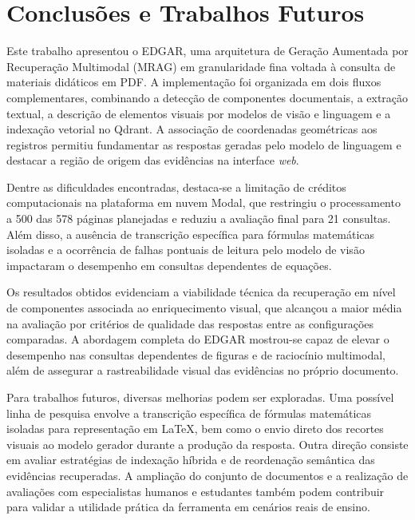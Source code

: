\chapter{Conclusões e Trabalhos Futuros}
\label{chap:conclusoes-e-trabalhos-futuros}

Este trabalho apresentou o EDGAR, uma arquitetura de Geração Aumentada por Recuperação Multimodal (MRAG) em granularidade fina voltada à consulta de materiais didáticos em PDF. A implementação foi organizada em dois fluxos complementares, combinando a detecção de componentes documentais, a extração textual, a descrição de elementos visuais por modelos de visão e linguagem e a indexação vetorial no Qdrant. A associação de coordenadas geométricas aos registros permitiu fundamentar as respostas geradas pelo modelo de linguagem e destacar a região de origem das evidências na interface \textit{web}.

Dentre as dificuldades encontradas, destaca-se a limitação de créditos computacionais na plataforma em nuvem Modal, que restringiu o processamento a 500 das 578 páginas planejadas e reduziu a avaliação final para 21 consultas. Além disso, a ausência de transcrição específica para fórmulas matemáticas isoladas e a ocorrência de falhas pontuais de leitura pelo modelo de visão impactaram o desempenho em consultas dependentes de equações.

Os resultados obtidos evidenciam a viabilidade técnica da recuperação em nível de componentes associada ao enriquecimento visual, que alcançou a maior média na avaliação por critérios de qualidade das respostas entre as configurações comparadas. A abordagem completa do EDGAR mostrou-se capaz de elevar o desempenho nas consultas dependentes de figuras e de raciocínio multimodal, além de assegurar a rastreabilidade visual das evidências no próprio documento.

Para trabalhos futuros, diversas melhorias podem ser exploradas. Uma possível linha de pesquisa envolve a transcrição específica de fórmulas matemáticas isoladas para representação em LaTeX, bem como o envio direto dos recortes visuais ao modelo gerador durante a produção da resposta. Outra direção consiste em avaliar estratégias de indexação híbrida e de reordenação semântica das evidências recuperadas. A ampliação do conjunto de documentos e a realização de avaliações com especialistas humanos e estudantes também podem contribuir para validar a utilidade prática da ferramenta em cenários reais de ensino.
